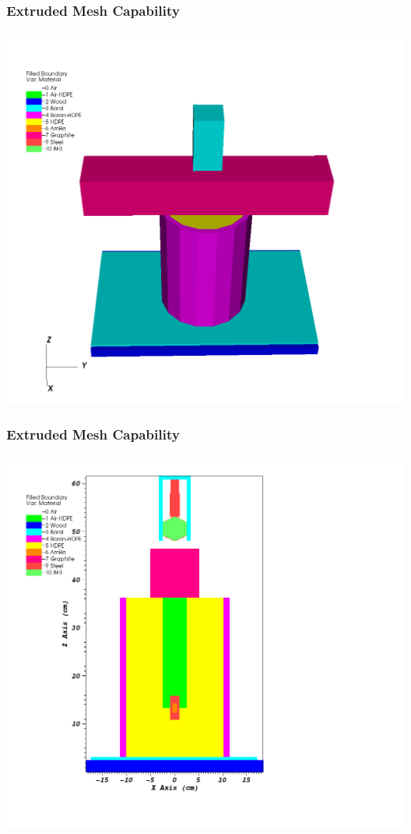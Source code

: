 \documentclass[]{beamer}
\begin{document}
\subsection{}

\begin{frame}[t]\frametitle{Extruded Mesh Capability}
\centering
\includegraphics[scale=0.2]{figures/IM1_3D.png}
\end{frame}

\begin{frame}[t]\frametitle{Extruded Mesh Capability}
\centering
\includegraphics[scale=0.23]{figures/IM1_Adams_2D_slice}
\end{frame}
\end{document}
